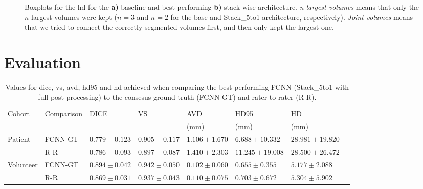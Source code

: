 \begin{figure}[htbp]
	\centering
	\hfill
	\caption[Boxplots for the \acrlong{hd} for Post-processing]{Boxplots for the \acrlong{hd} for the \textbf{a)} baseline and best performing \textbf{b)} stack-wise architecture. \textit{n largest volumes} means that only the $n$ largest volumes were kept ($n = 3$ and $n = 2$ for the base and Stack\_5to1 architecture, respectively). \textit{Joint volumes} means that we tried to connect the correctly segmented volumes first, and then only kept the largest one.}
	\label{fig:pp_boxplots_hd}  
\end{figure}

\section{Evaluation} %

\begin{sidewaystable}[htbp]
   \centering
   \caption[Detailed Results for Evaluation]{Values for \acrlong{dice}, \acrlong{vs}, \acrlong{avd}, \acrlong{hd95} and \acrlong{hd} achieved when comparing the best performing FCNN (Stack\_5to1 with full post-processing) to the consesus ground truth (FCNN-GT) and rater to rater (R-R).}
   \begin{tabular}{l*{7}{l}}
      \toprule
      Cohort	& Comparison & DICE				& VS				& AVD				& HD95				& HD				\\
      			&					&					&					& (mm)				& (mm)				& (mm)				\\
      \midrule
        Patient     & FCNN-GT & $0.779 \pm 0.123$ & $\mathbf{0.905 \pm 0.117}$ & $\mathbf{1.106 \pm 1.670}$ & $\mathbf{6.688  \pm 10.332}$ & $28.981 \pm 19.820$ \\
                    & R-R     & $\mathbf{0.786 \pm 0.093}$ & $0.897 \pm 0.087$ & $1.410 \pm 2.303$ & $11.245 \pm 19.008$ & $\mathbf{28.500 \pm 26.472}$ \\
        \midrule
        Volunteer   & FCNN-GT & $\mathbf{0.894 \pm 0.042}$ & $\mathbf{0.942 \pm 0.050}$ & $\mathbf{0.102 \pm 0.060}$ & $\mathbf{0.655  \pm 0.355} $ & $\mathbf{5.177  \pm 2.088} $ \\
                    & R-R     & $0.869 \pm 0.031$ & $0.937 \pm 0.043$ & $0.110 \pm 0.075$ & $0.703  \pm 0.672 $ & $5.304  \pm 5.902 $ \\
      \bottomrule
   \end{tabular}
   \label{tab:res_fcnn_rater}
\end{sidewaystable}

